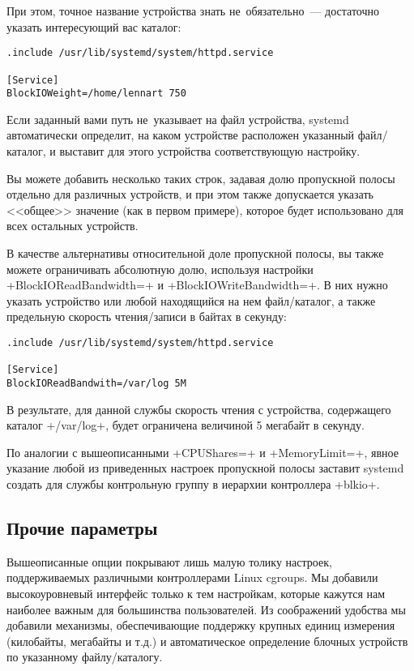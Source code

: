 \documentclass[10pt,oneside,a4paper]{article}
\begin{document}
При этом, точное название устройства знать не~обязательно~--- достаточно указать
интересующий вас каталог:
\begin{Verbatim}
.include /usr/lib/systemd/system/httpd.service

[Service]
BlockIOWeight=/home/lennart 750
\end{Verbatim}
Если заданный вами путь не~указывает на файл устройства, systemd автоматически
определит, на каком устройстве расположен указанный файл/каталог, и выставит для
этого устройства соответствующую настройку.

Вы можете добавить несколько таких строк, задавая долю пропускной полосы
отдельно для различных устройств, и при этом также допускается указать <<общее>>
значение (как в первом примере), которое будет использовано для всех остальных
устройств.

В качестве альтернативы относительной доле пропускной полосы, вы также можете
ограничивать абсолютную долю, используя настройки +BlockIOReadBandwidth=+ и
+BlockIOWriteBandwidth=+. В них нужно указать устройство или любой находящийся
на нем файл/каталог, а также предельную скорость чтения/записи в байтах в
секунду:
\begin{Verbatim}
.include /usr/lib/systemd/system/httpd.service

[Service]
BlockIOReadBandwith=/var/log 5M
\end{Verbatim}
В результате, для данной службы скорость чтения с устройства, содержащего
каталог +/var/log+, будет ограничена величиной 5 мегабайт в секунду.

По аналогии с вышеописанными +CPUShares=+ и +MemoryLimit=+, явное указание любой
из приведенных настроек пропускной полосы заставит systemd создать для службы
контрольную группу в иерархии контроллера +blkio+.

\subsection{Прочие параметры}

Вышеописанные опции покрывают лишь малую толику настроек, поддерживаемых
различными контроллерами Linux cgroups. Мы добавили высокоуровневый интерфейс
только к тем настройкам, которые кажутся нам наиболее важным для большинства
пользователей. Из соображений удобства мы добавили механизмы, обеспечивающие
поддержку крупных единиц измерения (килобайты, мегабайты и т.д.) и
автоматическое определение блочных устройств по указанному файлу/каталогу.
\end{document}
